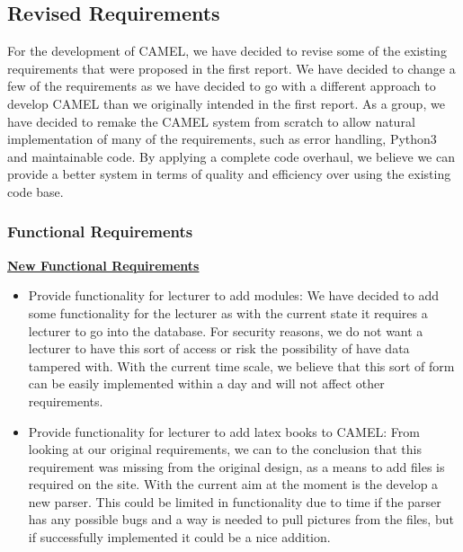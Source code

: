 \subsection{Revised Requirements}
	For the development of CAMEL, we have decided to revise some of the existing requirements that were proposed in the first report. We have decided to change a few of the requirements as we have decided to go with a different approach to develop CAMEL than we originally intended in the first report. As a group, we have decided to remake the CAMEL system from scratch to allow natural implementation of many of the requirements, such as error handling, Python3 and maintainable code. By applying a complete code overhaul, we believe we can provide a better system in terms of quality and efficiency over using the existing code base.\\    
	
	\subsubsection{Functional Requirements}
	\underline{\textbf{New Functional Requirements}}
	\begin{itemize}
		\item Provide functionality for lecturer to add modules: We have decided to add some functionality for the lecturer as with the current state it requires a lecturer to go into the database. For security reasons, we do not want a lecturer to have this sort of access or risk the possibility of have data tampered with. With the current time scale, we believe that this sort of form can be easily implemented within a day and will not affect other requirements. 
		
		\item Provide functionality for lecturer to add latex books to CAMEL: From looking at our original requirements, we can to the conclusion that this requirement was missing from the original design, as a means to add files is required on the site. With the current aim at the moment is the develop a new parser. This could be limited in functionality due to time if the parser has any possible bugs and a way is needed to pull pictures from the files, but if successfully implemented it could be a nice addition.
	\end{itemize}
	
